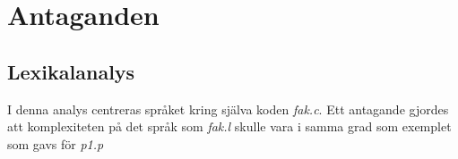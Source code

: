 \section{Antaganden}

\subsection{Lexikalanalys}
I denna analys centreras språket kring själva koden \textit{fak.c}. Ett antagande gjordes att
komplexiteten på det språk som \textit{fak.l} skulle vara i samma grad som exemplet som gavs för
\textit{p1.p} 
